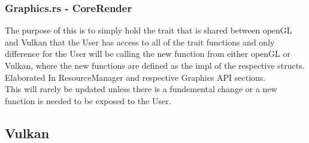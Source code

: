 \documentclass[12pt,a4paper]{article}
\begin{document}
\subsubsection{Graphics.rs - CoreRender}
The purpose of this is to simply hold the trait that is shared between openGL and Vulkan that the User has access to all of the trait functions and only difference for the User will be calling the new function from either openGL or Vulkan, where the new functions are defined as the impl of the respective structs.\\
Elaborated In ResourceManager and respective Graphics API sections.
\\
This will rarely be updated unless there is a fundemental change or a new function is needed to be exposed to the User.
\subsection{Vulkan}
\end{document}
